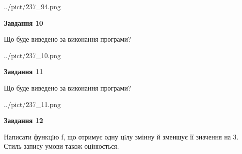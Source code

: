 \documentclass[12pt, ukrainian]{article}
\begin{document}
{\begin {large}
\begin{center}
	{../pict/237_94.png}
\end{center}
\newpage

{\begin {center}\textbf{Завдання 10}\end {center}}

Що буде виведено за виконання програми?\par
\begin{center}
	{../pict/237_10.png}
\end{center}
\newpage

{\begin {center}\textbf{Завдання 11}\end {center}}

Що буде виведено за виконання програми?\par
\begin{center}
	{../pict/237_11.png}
\end{center}
\newpage

{\begin {center}\textbf{Завдання 12}\end {center}}


Написати функцiю f, що отримує одну цiлу змінну й зменшує її значення на 3. Стиль запису умови також оцінюється.\par
\newpage

\end {large}}
\end{document}
